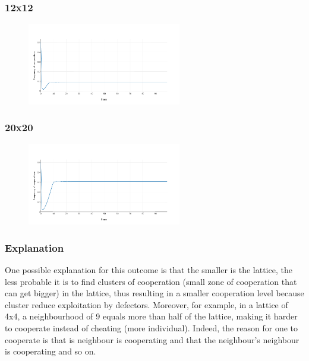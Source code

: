 \documentclass[11pt]{article}
\begin{document}
\subsubsection{12x12}

\begin{figure}[H]
\centering
   \includegraphics[width=0.6\textwidth]{img/part1/cf-moore-12-12.png}
\end{figure}

\subsubsection{20x20}

\begin{figure}[H]
\centering
   \includegraphics[width=0.6\textwidth]{img/part1/cf-moore-20-20.png}
\end{figure}

\subsubsection{Explanation}

One possible explanation for this outcome is that the smaller is the lattice, the less probable it is to find clusters of cooperation (small zone of cooperation that can get bigger) in the lattice, thus resulting in a smaller cooperation level because cluster reduce exploitation by defectors. Moreover, for example, in a lattice of 4x4, a neighbourhood of 9 equals more than half of the lattice, making it harder to cooperate instead of cheating (more individual). Indeed, the reason for one to cooperate is that is neighbour is cooperating and that the neighbour's neighbour is cooperating and so on.
\end{document}
